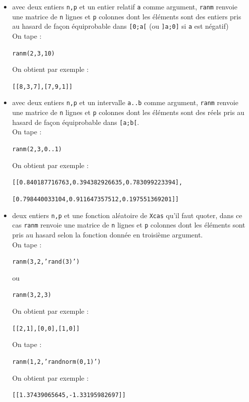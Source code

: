 \documentclass[a4paper,11pt]{book}
\begin{document}
\begin{itemize}
\item avec deux entiers {\tt n,p} et un entier relatif {\tt a} comme argument, 
{\tt ranm} renvoie une matrice de {\tt n} lignes et {\tt p} colonnes dont 
les \'el\'ements sont des entiers pris au hasard de fa\c{c}on \'equiprobable 
dans  {\tt [0;a[} (ou {\tt ]a;0]} si {\tt a} est n\'egatif)\\
On tape :
\begin{center}{\tt ranm(2,3,10)}\end{center}
On obtient par exemple :
\begin{center}{\tt[[8,3,7],[7,9,1]]}\end{center}
\item avec deux entiers {\tt n,p} et un intervalle {\tt a..b} comme argument, 
{\tt ranm} renvoie une matrice de {\tt n} lignes et {\tt p} colonnes dont les 
\'el\'ements sont des r\'eels  pris au hasard de fa\c{c}on \'equiprobable dans 
{\tt [a;b[}.\\
On tape :
\begin{center}{\tt ranm(2,3,0..1)}\end{center}
On obtient par exemple :
\begin{center}{\tt [[0.840187716763,0.394382926635,0.783099223394],}\end{center}
\begin{center}{\tt [0.798440033104,0.911647357512,0.197551369201]] }\end{center}
\item deux entiers {\tt n,p} et une fonction al\'eatoire  de {\tt Xcas} qu'il 
faut quoter, dans ce cas 
{\tt ranm} renvoie une matrice de {\tt n} lignes et {\tt p} colonnes dont 
les \'el\'ements sont pris au hasard selon la fonction donn\'ee en 
troisi\`eme argument.\\ 
On tape :
\begin{center}{\tt ranm(3,2,'rand(3)')}\end{center}
ou
\begin{center}{\tt ranm(3,2,3)}\end{center}
On obtient par exemple :
\begin{center}{\tt [[2,1],[0,0],[1,0]]}\end{center}
On tape :
\begin{center}{\tt ranm(1,2,'randnorm(0,1)')}\end{center}
On obtient par exemple :
\begin{center}{\tt [[1.37439065645,-1.33195982697]]}\end{center}
\end{itemize}
\end{document}
